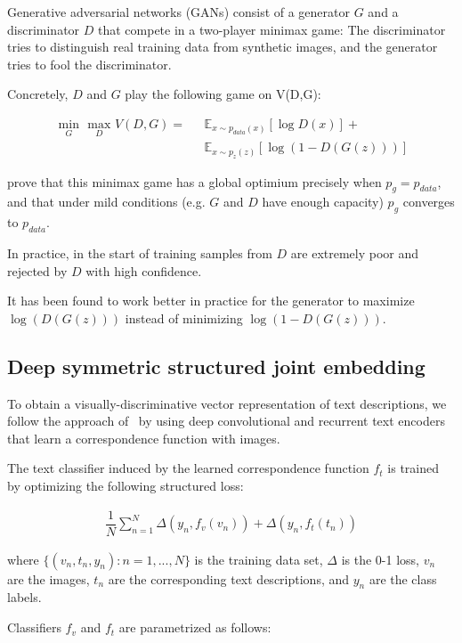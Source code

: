 Generative adversarial networks (GANs) consist of a generator $G$ and a discriminator $D$ that compete in a two-player minimax game: The discriminator tries to distinguish real training data from synthetic images, and the generator tries to fool the discriminator.

Concretely, $D$ and $G$ play the following game on V(D,G):

\begin{align}
\underset{G}{\text{ min }} \underset{D}{\text{ max }} V( D, G) =& \text{ }\mathbb{E}_{ x \sim p_{data}(x)}[\log D(x)] + \\
& \text{ }\mathbb{E}_{ x \sim p_z(z)}[\log(1-D(G(z)))] \nonumber
\end{align}

\citet{goodfellow2014generative} prove that this minimax game has a global optimium precisely when $p_g = p_{data}$, and that under mild conditions (e.g. $G$ and $D$ have enough capacity) $p_g$ converges to $p_{data}$. 

In practice, in the start of training samples from $D$ are extremely poor and rejected by $D$ with high confidence.

It has been found to work better in practice for the generator to maximize $\log(D(G(z)))$ instead of minimizing $\log(1-D(G(z)))$.

\subsection{Deep symmetric structured joint embedding}
\label{preliminary_sje}

To obtain a visually-discriminative vector representation of text descriptions, we follow the approach of~\citet{reed2015learning} by using deep convolutional and recurrent text encoders that learn a correspondence function with images.

The text classifier induced by the learned correspondence function $f_t$ is trained by optimizing the following structured loss:

\begin{align}
\label{eq:objective}
\dfrac{1}{N}\sum_{n=1}^{N}\Delta(y_{n},f_v(v_n)) + \Delta(y_{n},f_t(t_n))
\end{align}

where $\{(v_{n},t_{n},y_{n}): n = 1, ..., N\}$ is the training data set, $\Delta$ is the 0-1 loss, $v_n$ are the images, $t_n$ are the corresponding text descriptions, and $y_n$ are the class labels.

Classifiers $f_v$ and $f_t$ are parametrized as follows:

